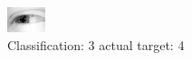 \begin{figure}[h!]
\begin{center}
\includegraphics[width=0.60\columnwidth]{figures/ID2547_class_3_target_4.png}
\end{center}
\caption{ Classification: 3 actual target: 4}
\label{fig:ID2547_class_3_target_4}
\end{figure}
